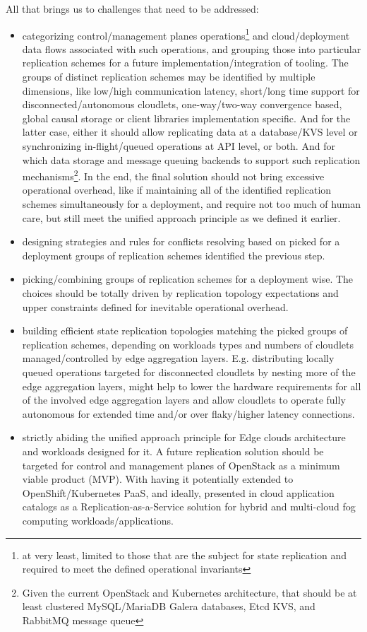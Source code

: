 \documentclass[conference]{IEEEtran}
\begin{document}
All that brings us to challenges that need to be addressed:
\begin{itemize}
  \item categorizing control/management planes operations\footnote{at very
    least, limited to those that are the subject for state replication and
    required to meet the defined operational invariants} and cloud/deployment
    data flows associated with such operations, and grouping those into
    particular replication schemes for a future implementation/integration of
    tooling. The groups of distinct replication schemes may be identified by
    multiple dimensions, like low/high communication latency, short/long time
    support for disconnected/autonomous cloudlets, one-way/two-way convergence
    based, global causal storage or client libraries implementation specific.
    And for the latter case, either it should allow replicating data at a
    database/KVS level or synchronizing in-flight/queued operations at API
    level, or both. And for which data storage and message queuing backends to
    support such replication mechanisms\footnote{Given the current OpenStack
    and Kubernetes architecture, that should be at least clustered
    MySQL/MariaDB Galera databases, Etcd KVS, and RabbitMQ message queue}. In
    the end, the final solution should not bring excessive operational
    overhead, like if maintaining all of the identified replication schemes
    simultaneously for a deployment, and require not too much of human care,
    but still meet the unified approach principle as we defined it earlier.
  \item designing strategies and rules for conflicts resolving based on picked
    for a deployment groups of replication schemes identified the previous step.
  \item picking/combining groups of replication schemes for a deployment wise.
    The choices should be totally driven by replication topology expectations
    and upper constraints defined for inevitable operational overhead.
  \item building efficient state replication topologies matching the picked
    groups of replication schemes, depending on workloads types and numbers of
    cloudlets managed/controlled by edge aggregation layers. E.g. distributing
    locally queued operations targeted for disconnected cloudlets by nesting
    more of the edge aggregation layers, might help to lower the hardware
    requirements for all of the involved edge aggregation layers and allow
    cloudlets to operate fully autonomous for extended time and/or over
    flaky/higher latency connections.
  \item strictly abiding the unified approach principle for Edge clouds architecture
    and workloads designed for it. A future replication solution should be
    targeted for control and management planes of OpenStack as a minimum viable
    product (MVP). With having it potentially extended to OpenShift/Kubernetes
    PaaS, and ideally, presented in cloud application catalogs as a
    Replication-as-a-Service solution for hybrid and multi-cloud fog computing
    workloads/applications.
\end{itemize}
\end{document}
